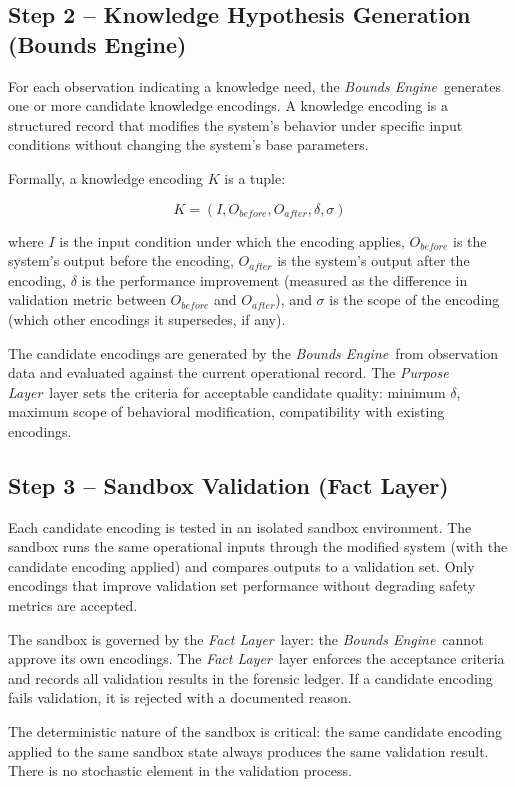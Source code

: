\documentclass[12pt]{article}
\newcommand{\purpose}{\textit{Purpose Layer}}
\newcommand{\bounds}{\textit{Bounds Engine}}
\newcommand{\fact}{\textit{Fact Layer}}
\begin{document}
\subsection{Step 2 -- Knowledge Hypothesis Generation (Bounds Engine)}

For each observation indicating a knowledge need, the \bounds\ generates one or more candidate knowledge encodings. A knowledge encoding is a structured record that modifies the system's behavior under specific input conditions without changing the system's base parameters.

Formally, a knowledge encoding $K$ is a tuple:

$$K = (I, O_{before}, O_{after}, \delta, \sigma)$$

where $I$ is the input condition under which the encoding applies, $O_{before}$ is the system's output before the encoding, $O_{after}$ is the system's output after the encoding, $\delta$ is the performance improvement (measured as the difference in validation metric between $O_{before}$ and $O_{after}$), and $\sigma$ is the scope of the encoding (which other encodings it supersedes, if any).

The candidate encodings are generated by the \bounds\ from observation data and evaluated against the current operational record. The \purpose\ layer sets the criteria for acceptable candidate quality: minimum $\delta$, maximum scope of behavioral modification, compatibility with existing encodings.

\subsection{Step 3 -- Sandbox Validation (Fact Layer)}

Each candidate encoding is tested in an isolated sandbox environment. The sandbox runs the same operational inputs through the modified system (with the candidate encoding applied) and compares outputs to a validation set. Only encodings that improve validation set performance without degrading safety metrics are accepted.

The sandbox is governed by the \fact\ layer: the \bounds\ cannot approve its own encodings. The \fact\ layer enforces the acceptance criteria and records all validation results in the forensic ledger. If a candidate encoding fails validation, it is rejected with a documented reason.

The deterministic nature of the sandbox is critical: the same candidate encoding applied to the same sandbox state always produces the same validation result. There is no stochastic element in the validation process.
\end{document}
